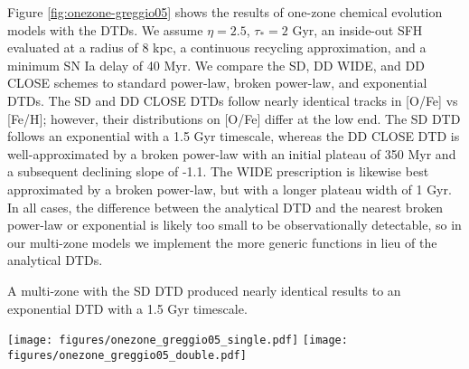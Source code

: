 \documentclass[twocolumn,linenumbers,twocolappendix]{aastex631}
\begin{document}

Figure \ref{fig:onezone-greggio05} shows the results of one-zone chemical evolution models with the \citet{Greggio2005-AnalyticalRates} DTDs. We assume $\eta=2.5$, $\tau_*=2$ Gyr, an inside-out SFH evaluated at a radius of 8 kpc, a continuous recycling approximation, and a minimum SN Ia delay of 40 Myr. We compare the SD, DD WIDE, and DD CLOSE schemes to standard power-law, broken power-law, and exponential DTDs. The SD and DD CLOSE DTDs follow nearly identical tracks in [O/Fe] vs [Fe/H]; however, their distributions on [O/Fe] differ at the low end. The SD DTD follows an exponential with a 1.5 Gyr timescale, whereas the DD CLOSE DTD is well-approximated by a broken power-law with an initial plateau of 350 Myr and a subsequent declining slope of -1.1. The WIDE prescription is likewise best approximated by a broken power-law, but with a longer plateau width of 1 Gyr. In all cases, the difference between the analytical DTD and the nearest broken power-law or exponential is likely too small to be observationally detectable, so in our multi-zone models we implement the more generic functions in lieu of the analytical DTDs.

A multi-zone with the \citet{Greggio2005-AnalyticalRates} SD DTD produced nearly identical results to an exponential DTD with a 1.5 Gyr timescale.

\begin{figure*}
    \centering
    \texttt{[image: figures/onezone\_greggio05\_single.pdf]}
    \texttt{[image: figures/onezone\_greggio05\_double.pdf]}
    \caption{Abundance tracks and distributions from one-zone models with the analytical DTDs from \citet{Greggio2005-AnalyticalRates}. \textit{Left:} a comparison between the analytical SD DTD (solid magenta curve), an exponential DTD with a 1.5 Gyr timescale (dashed pink curve), and a power-law DTD with a slope of -1.1 (dotted black curve). \textit{Right:} a comparison between WIDE and CLOSE prescriptions for an analytical DD DTD (solid blue and green curves, respectively), power-law DTDs with an initial plateau of 1 Gyr and 300 Myr (dashed cyan and yellow curves, respectively), and a power-law DTD with no plateau and a slope of -1.1 (dotted black curve).}
    \label{fig:onezone-greggio05}
\end{figure*}
\end{document}
